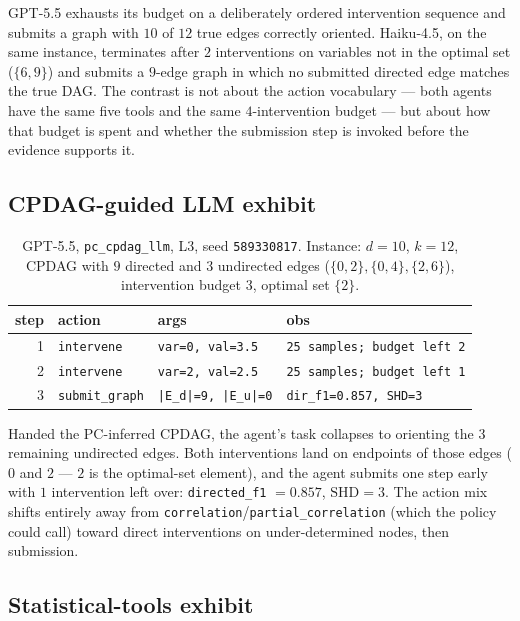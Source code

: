 GPT-5.5 exhausts its budget on a deliberately ordered intervention sequence and submits a graph with $10$ of $12$ true edges correctly oriented. Haiku-4.5, on the same instance, terminates after $2$ interventions on variables not in the optimal set ($\{6, 9\}$) and submits a $9$-edge graph in which no submitted directed edge matches the true DAG. The contrast is not about the action vocabulary — both agents have the same five tools and the same $4$-intervention budget — but about how that budget is spent and whether the submission step is invoked before the evidence supports it.

\subsection{CPDAG-guided LLM exhibit}
\label{app:traces:cpdag}

\begin{table}[h]
\centering
\small
\begin{tabular}{@{}r l l l@{}}
\toprule
step & action & args & obs \\
\midrule
1 & \texttt{intervene}    & \texttt{var=0, val=3.5}   & \texttt{25 samples; budget left 2} \\
2 & \texttt{intervene}    & \texttt{var=2, val=2.5}   & \texttt{25 samples; budget left 1} \\
3 & \texttt{submit\_graph} & \texttt{|E\_d|=9, |E\_u|=0} & \texttt{dir\_f1=0.857, SHD=3} \\
\bottomrule
\end{tabular}
\caption{GPT-5.5, \texttt{pc\_cpdag\_llm}, L3, seed \texttt{589330817}. Instance: $d = 10$, $k = 12$, CPDAG with $9$ directed and $3$ undirected edges ($\{0,2\}, \{0,4\}, \{2,6\}$), intervention budget $3$, optimal set $\{2\}$.}
\label{tab:trace3}
\end{table}

Handed the PC-inferred CPDAG, the agent's task collapses to orienting the $3$ remaining undirected edges. Both interventions land on endpoints of those edges ($0$ and $2$ — $2$ is the optimal-set element), and the agent submits one step early with $1$ intervention left over: \texttt{directed\_f1} $= 0.857$, $\mathrm{SHD} = 3$. The action mix shifts entirely away from \texttt{correlation}/\texttt{partial\_correlation} (which the policy could call) toward direct interventions on under-determined nodes, then submission.

\subsection{Statistical-tools exhibit}
\label{app:traces:stats}

